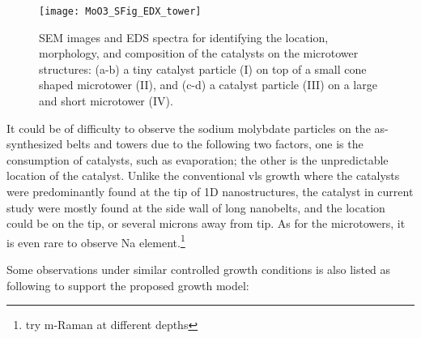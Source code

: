 \begin{figure}[htb]
\centering
\texttt{[image: MoO3\_SFig\_EDX\_tower]}
\caption[Growth evolution of : second stage]{SEM images and EDS spectra for identifying the location, morphology, and composition of the catalysts on the microtower structures: (a-b) a tiny catalyst particle (I) on top of a small cone shaped microtower (II), and (c-d) a catalyst particle (III) on a large and short microtower (IV).}
\label{fig:ch4edx2}
\end{figure}
It could be of difficulty to observe the sodium molybdate particles on the as-synthesized belts and towers due to the following two factors, one is the consumption of catalysts, such as evaporation; the other is the unpredictable location of the catalyst. Unlike the conventional \gls{vls} growth where the catalysts were predominantly found at the tip of 1D nanostructures, the catalyst in current study were mostly found at the side wall of long nanobelts, and the location could be on the tip, or several microns away from tip. As for the microtowers, it is even rare to observe Na element.\footnote{try m-Raman at different depths} 

Some observations under similar controlled growth conditions is also listed as following to support the proposed growth model: 

